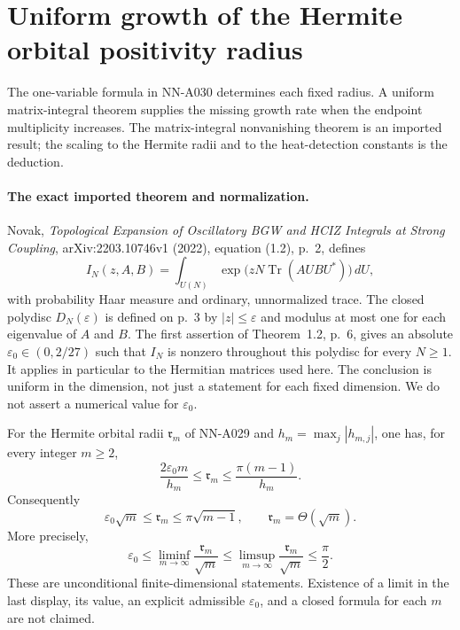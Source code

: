 \section{Uniform growth of the Hermite orbital positivity radius}
\label{sec:analytic-hermite-radius-growth}

The one-variable formula in NN-A030 determines each fixed radius.
A uniform matrix-integral theorem supplies the missing growth rate
when the endpoint multiplicity increases. The matrix-integral
nonvanishing theorem is an imported result; the scaling to the
Hermite radii and to the heat-detection constants is the deduction.

\paragraph{The exact imported theorem and normalization.}
Novak, \emph{Topological Expansion of Oscillatory BGW and HCIZ
Integrals at Strong Coupling}, arXiv:2203.10746v1 (2022), equation
(1.2), p.~2, defines
\[
 I_N(z,A,B)=\int_{U(N)}
          \exp\bigl(zN\operatorname{Tr}(AUBU^*)\bigr)\,dU,
\]
with probability Haar measure and ordinary, unnormalized trace.
The closed polydisc $D_N(\varepsilon)$ is defined on p.~3 by
$|z|\le\varepsilon$ and modulus at most one for each eigenvalue
of $A$ and $B$. The first assertion of Theorem~1.2, p.~6, gives
an absolute $\varepsilon_0\in(0,2/27)$ such that $I_N$ is nonzero
throughout this polydisc for every $N\ge1$. It applies in
particular to the Hermitian matrices used here. The conclusion
is uniform in the dimension, not just a statement for each fixed
dimension. We do not assert a numerical value for $\varepsilon_0$.

\begin{theorem}
\label{thm:analytic-hermite-radius-growth}
For the Hermite orbital radii $\mathfrak r_m$ of NN-A029 and
$h_m=\max_j|h_{m,j}|$, one has, for every integer $m\ge2$,
\begin{equation}\label{eq:analytic-radius-stable-bounds}
 \frac{2\varepsilon_0 m}{h_m}
       \le\mathfrak r_m\le\frac{\pi(m-1)}{h_m}.
\end{equation}
Consequently
\begin{equation}\label{eq:analytic-radius-root-growth}
 \varepsilon_0\sqrt m\le\mathfrak r_m
                         \le\pi\sqrt{m-1},
 \qquad\mathfrak r_m=\Theta(\sqrt m).
\end{equation}
More precisely,
\begin{equation}\label{eq:analytic-radius-liminf-limsup}
 \varepsilon_0\le
 \liminf_{m\to\infty}\frac{\mathfrak r_m}{\sqrt m}
 \le\limsup_{m\to\infty}\frac{\mathfrak r_m}{\sqrt m}
 \le\frac\pi2.
\end{equation}
These are unconditional finite-dimensional statements. Existence
of a limit in the last display, its value, an explicit admissible
$\varepsilon_0$, and a closed formula for each $m$ are not claimed.
\end{theorem}


